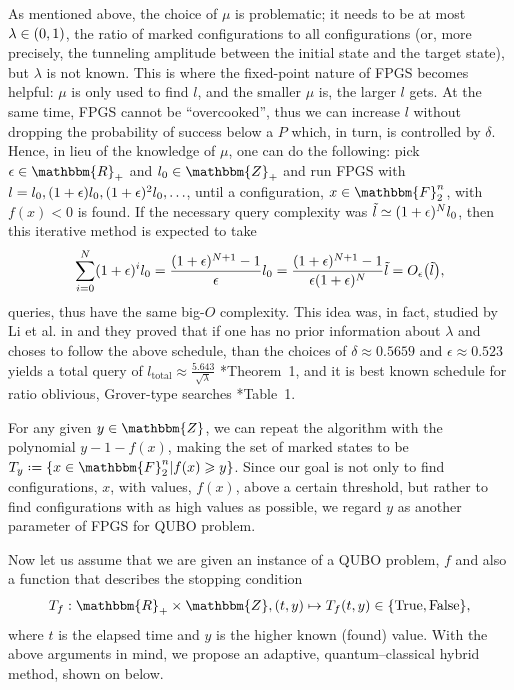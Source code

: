 \documentclass[reqno, 12pt]{amsart}
\numberwithin{equation}{section}                %
\let\originalleft\left
\let\originalright\right
\renewcommand{\left}{\mathopen{}\mathclose\bgroup\originalleft}
\renewcommand{\right}{\aftergroup\egroup\originalright}
\def\({\mathopen{}\left(}
\def\){\right)\mathclose{}}
\newcommand*{\eqdef}{\mathrel{\vcenter{\baselineskip0.5ex \lineskiplimit0pt\hbox{.}\hbox{.}}}=}
\def\F{\mathbbm{F}}
\def\rl{\mathbbm{R}}
\def\Z{\mathbbm{Z}}
\begin{document}
As mentioned above, the choice of $\mu$ is problematic; it needs to be at most $\lambda \in \( 0, 1 \)$, the ratio of marked configurations to all configurations (or, more precisely, the tunneling amplitude between the initial state and the target state), but $\lambda$ is not known. This is where the fixed-point nature of FPGS becomes helpful: $\mu$ is only used to find $l$, and the smaller $\mu$ is, the larger $l$ gets. At the same time, FPGS cannot be ``overcooked'', thus we can increase $l$ without dropping the probability of success below a $P$ which, in turn, is controlled by $\delta$. Hence, in lieu of the knowledge of $\mu$, one can do the following: pick $\epsilon \in \rl_+$ and $l_0 \in \Z_+$ and run FPGS with $l = l_0, \( 1 + \epsilon \) l_0, \( 1 + \epsilon \)^2 l_0, \ldots$, until a configuration, $x \in \F_2^n$, with $f(x) < 0$ is found. If the necessary query complexity was $\tilde{l} \simeq \( 1 + \epsilon \)^N l_0$, then this iterative method is expected to take
\begin{equation}
    \sum_{i = 0}^N \( 1 + \epsilon \)^i l_0 = \frac{\( 1 + \epsilon \)^{N + 1} - 1}{\epsilon} l_0 = \frac{\( 1 + \epsilon \)^{N + 1} - 1}{\epsilon \( 1 + \epsilon \)^N} \tilde{l} = O_\epsilon \( \tilde{l} \),
\end{equation}
queries, thus have the same big-$O$ complexity. This idea was, in fact, studied by Li et al. in \cite{li_quantum_2019} and they proved that if one has no prior information about $\lambda$ and choses to follow the above schedule, than the choices of $\delta \approx 0.5659$ and $\epsilon \approx 0.523$ yields a total query of $l_{\mathrm{total}} \approx \tfrac{5.643}{\sqrt{\lambda}}$ \cite{li_quantum_2019}*{Theorem~1}, and it is best known schedule for ratio oblivious, Grover-type searches \cite{li_quantum_2019}*{Table~1}.

For any given $y \in \Z$, we can repeat the algorithm with the polynomial $y - 1 - f(x)$, making the set of marked states to be $T_y \eqdef \{ x \in \F_2^n | f(x) \geqslant y \}$. Since our goal is not only to find configurations, $x$, with values, $f(x)$, above a certain threshold, but rather to find configurations with as high values as possible, we regard $y$ as another parameter of FPGS for QUBO problem.

\smallskip

Now let us assume that we are given an instance of a QUBO problem, $f$ and also a function that describes the stopping condition
\begin{equation}
    T_f : \rl_+ \times \Z, \( t, y \) \mapsto T_f \( t, y \) \in \{ \mathrm{True}, \mathrm{False} \},
\end{equation}
where $t$ is the elapsed time and $y$ is the higher known (found) value. With the above arguments in mind, we propose an adaptive, quantum--classical hybrid method, shown on  below.
\end{document}
